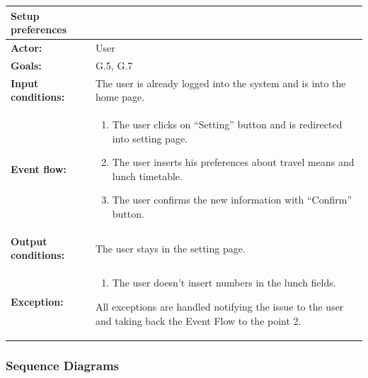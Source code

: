 \begin{tabular} { p{5cm} p{8cm} }
\textbf{Setup preferences} \\
\hline
\textbf{Actor:} & User \\ 
\textbf{Goals:} & G.5, G.7 \\ 
\textbf{Input conditions:} & The user is already logged into the system and is into the home page. \\
\textbf{Event flow:} & \begin{enumerate}
				\item
				The user clicks on “Setting” button and is redirected into setting page.
				\item
				The user inserts his preferences about travel means and lunch timetable.
				\item
				The user confirms the new information with “Confirm” button.
			\end{enumerate}\\ 
\textbf{Output conditions:} & The user stays in the setting page.\\ 
\textbf{Exception:} & \begin{enumerate}
				\item
				The user doesn’t insert numbers in the lunch fields.
			\end{enumerate}
All exceptions are handled notifying the issue to the user and taking back the Event Flow to the point 2. \\
\hline
\end{tabular}


\subsubsection{Sequence Diagrams}
